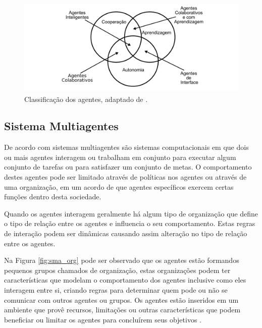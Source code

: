 \begin{figure}[ht]
\centering
\includegraphics[scale=0.7]{imagens/tipos_agentes.pdf}
\caption{Classificação dos agentes, adaptado de \cite{nwana1996software}.}
\label{fig:class_agente}
\end{figure}

\subsection{Sistema Multiagentes}

De acordo com \cite{lesser1999cooperative} sistemas multiagentes são sistemas computacionais em que dois ou mais agentes interagem ou trabalham em conjunto para executar algum conjunto de tarefas ou para satisfazer um conjunto de metas. O comportamento destes agentes pode ser limitado através de políticas nos agentes ou através de uma organização, em um acordo de que agentes específicos exercem certas funções dentro desta sociedade.

Quando os agentes interagem geralmente há algum tipo de organização que define o tipo de relação entre os agentes e influencia o seu comportamento. Estas regras de interação podem ser dinâmicas causando assim alteração no tipo de relação entre os agentes. 

Na Figura \ref{fig:sma_org} pode ser observado que os agentes estão formandos pequenos grupos chamados de organização, estas organizações podem ter características que modelam o comportamento dos agentes inclusive como eles interagem entre si, criando regras para determinar quem pode ou não se comunicar com outros agentes ou grupos. Os agentes estão inseridos em um ambiente que provê recursos, limitações ou outras características que podem beneficiar ou limitar os agentes para concluírem seus objetivos  \cite{jennings2000agent}. 

